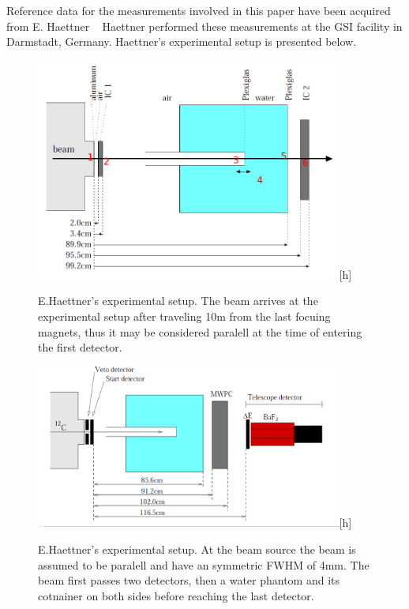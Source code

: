 Reference data for the measurements involved in this paper have been acquired from E. Haettner ~\cite{ehaettner}  Haettner performed these measurements at the GSI facility in Darmstadt, Germany. Haettner's experimental setup is presented below.

\begin{figure}[ht] 
\begin{center}
\includegraphics[width=0.9\textwidth]{images/haetnnersetup2.png}[h]  
\caption{\label{fig:haettnersetup} E.Haettner's experimental setup. The beam arrives at the experimental setup after traveling 10m from the last focuing magnets, thus it may be considered paralell at the time of entering the first detector.}
 \end{center}
 \end{figure}
\begin{figure}[ht] 
\begin{center}
\includegraphics[width=0.9\textwidth]{images/haettnersetup.png}[h]  
\caption{\label{fig:haettnersetup2} E.Haettner's experimental setup. At the beam source the beam is assumed to be paralell and have an symmetric FWHM of 4mm. The beam first passes two detectors, then a water phantom and its cotnainer on both sides before reaching the last detector.}
 \end{center}
 \end{figure}

